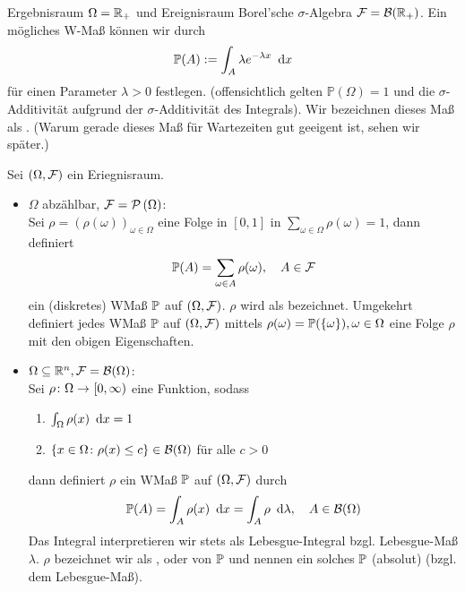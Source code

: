 \begin{beispiel} \label{beispiel: 1_1.7_exponentialverteilung}
    Ergebnisraum $\Omega = \R_+$ und Ereignisraum Borel'sche $\sigma$-Algebra $\mathcal{F} = \mathcal{B}(\R_+)$. Ein mögliches W-Maß können wir durch
    \begin{align*}
        \mathbb{P}(A) \defeq \int_A \lambda e^{-\lambda x} \dx
    \end{align*}
    für einen Parameter $\lambda > 0$ festlegen. (offensichtlich gelten $\mathbb{P}(\Omega) = 1$ und die $\sigma$-Additivität aufgrund der $\sigma$-Additivität des Integrals). Wir bezeichnen dieses Maß als . (Warum gerade dieses Maß für Wartezeiten gut geeigent ist, sehen wir später.)
\end{beispiel}


\begin{satz}
    Sei $(\Omega, \ereignisF)$ ein Eriegnisraum.
    \begin{itemize}[leftmargin=*]
        \item $\Omega$ abzählbar, $\ereignisF = \pows{\Omega}$:  \\
        Sei $\rho = \left( \rho(\omega) \right)_{\omega \in \Omega}$ eine Folge in $[0,1]$ in $\sum_{\omega \in \Omega} \rho(\omega) = 1$, dann definiert
        \begin{equation*}
        \P(A) = \sum_{\omega \in A} \rho(\omega), \quad A \in \ereignisF
        \end{equation*}
        ein (diskretes) WMaß $\P$ auf $(\Omega, \ereignisF)$. $\rho$ wird als  bezeichnet.
        Umgekehrt definiert jedes WMaß $\P$ auf $(\Omega, \ereignisF)$ mittels $\rho(\omega) = \P(\set{\omega}), \omega \in \Omega$ eine Folge $\rho$ mit den obigen Eigenschaften.
        \item $\Omega \subseteq \Rn, \ereignisF = \borel{\Omega}$: \\
        Sei $\abb{\rho}{\Omega}{[0, \infty)}$ eine Funktion, sodass
        \begin{enumerate}[nolistsep]
            \item $\int_{\Omega} \rho(x) \dx = 1$
            \item $\set{x \in \Omega \colon \rho(x) \leq c} \in \borel{\Omega}$ für alle $c > 0$ 
        \end{enumerate}
        dann definiert $\rho$ ein WMaß $\P$ auf $(\Omega, \ereignisF)$ durch 
        \begin{equation*}
            \P(A) = \int_{A} \rho(x) \dx = \int_{A} \rho \diff{\lambda}, \quad A \in \borel{\Omega}
        \end{equation*}
        Das Integral interpretieren wir stets als Lebesgue-Integral bzgl. Lebesgue-Maß $\lambda$.
        $\rho$ bezeichnet wir als ,  oder  von $\P$ und nennen ein solches $\P$ (absolut)  (bzgl. dem Lebesgue-Maß).
    \end{itemize}
\end{satz}

